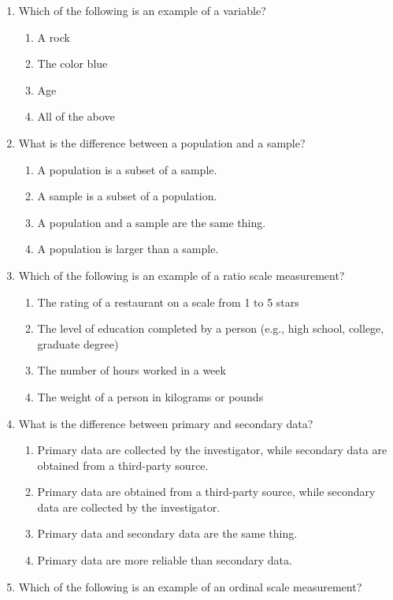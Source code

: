 \documentclass[
]{book}
\begin{document}
\begin{enumerate}
\def\labelenumi{\arabic{enumi}.}
\item
  Which of the following is an example of a variable?

  \begin{enumerate}
  \def\labelenumii{\alph{enumii}.}
  \item
    A rock
  \item
    The color blue
  \item
    Age
  \item
    All of the above
  \end{enumerate}
\item
  What is the difference between a population and a sample?

  \begin{enumerate}
  \def\labelenumii{\alph{enumii}.}
  \item
    A population is a subset of a sample.
  \item
    A sample is a subset of a population.
  \item
    A population and a sample are the same thing.
  \item
    A population is larger than a sample.
  \end{enumerate}
\item
  Which of the following is an example of a ratio scale measurement?

  \begin{enumerate}
  \def\labelenumii{\alph{enumii}.}
  \item
    The rating of a restaurant on a scale from 1 to 5 stars
  \item
    The level of education completed by a person (e.g., high school,
    college, graduate degree)
  \item
    The number of hours worked in a week
  \item
    The weight of a person in kilograms or pounds
  \end{enumerate}
\item
  What is the difference between primary and secondary data?

  \begin{enumerate}
  \def\labelenumii{\alph{enumii}.}
  \item
    Primary data are collected by the investigator, while secondary
    data are obtained from a third-party source.
  \item
    Primary data are obtained from a third-party source, while
    secondary data are collected by the investigator.
  \item
    Primary data and secondary data are the same thing.
  \item
    Primary data are more reliable than secondary data.
  \end{enumerate}
\item
  Which of the following is an example of an ordinal scale
  measurement?


\end{enumerate}
\end{document}
